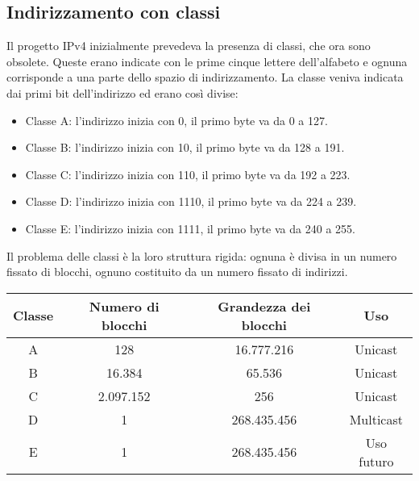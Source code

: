     \subsection{Indirizzamento con classi}
        Il progetto IPv4 inizialmente prevedeva la presenza di classi, che ora sono obsolete. Queste erano indicate con le prime cinque lettere dell'alfabeto e ognuna corrisponde a una parte dello spazio di indirizzamento. La classe veniva indicata dai primi bit dell'indirizzo ed erano così divise:
        \begin{itemize}
            \item Classe A: l'indirizzo inizia con 0, il primo byte va da 0 a 127.
            \item Classe B: l'indirizzo inizia con 10, il primo byte va da 128 a 191.
            \item Classe C: l'indirizzo inizia con 110, il primo byte va da 192 a 223.
            \item Classe D: l'indirizzo inizia con 1110, il primo byte va da 224 a 239.
            \item Classe E: l'indirizzo inizia con 1111, il primo byte va da 240 a 255.
        \end{itemize}
        
        Il problema delle classi è la loro struttura rigida: ognuna è divisa in un numero fissato di blocchi, ognuno costituito da un numero fissato di indirizzi.

            \begin{table}[h]
                \begin{center}
                    \begin{tabular}{cccc}
                        \hline
                        Classe & Numero di blocchi & Grandezza dei blocchi & Uso        \\ \hline
                        A      & 128               & 16.777.216            & Unicast    \\
                        B      & 16.384            & 65.536                & Unicast    \\
                        C      & 2.097.152         & 256                   & Unicast    \\
                        D      & 1                 & 268.435.456           & Multicast  \\
                        E      & 1                 & 268.435.456           & Uso futuro \\ \hline
                    \end{tabular}
                \end{center}
            \end{table}
            
